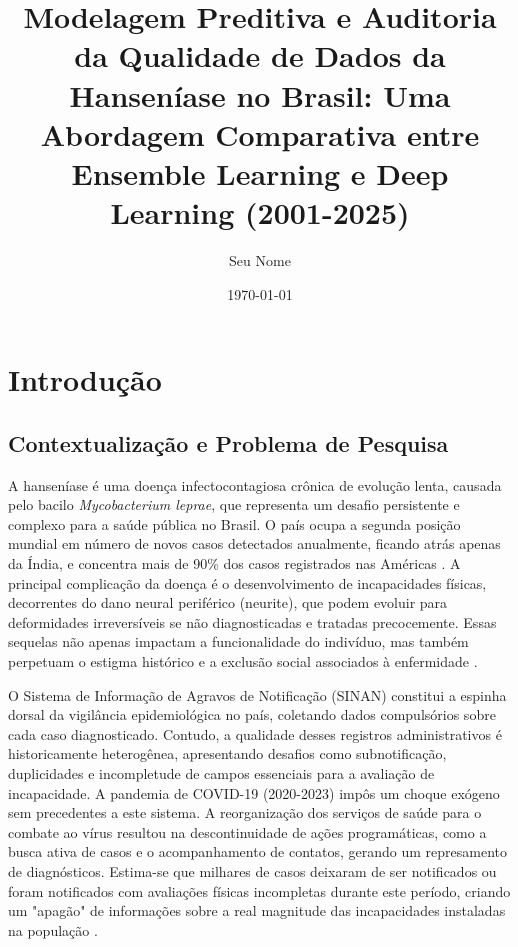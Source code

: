 \documentclass[12pt, a4paper]{report}
\title{\textbf{Modelagem Preditiva e Auditoria da Qualidade de Dados da Hanseníase no Brasil: Uma Abordagem Comparativa entre Ensemble Learning e Deep Learning (2001-2025)}}
\author{Seu Nome}
\date{\today}
\begin{document}
\maketitle
\tableofcontents
\newpage

\chapter{Introdução}

\section{Contextualização e Problema de Pesquisa}
A hanseníase é uma doença infectocontagiosa crônica de evolução lenta, causada pelo bacilo \textit{Mycobacterium leprae}, que representa um desafio persistente e complexo para a saúde pública no Brasil. O país ocupa a segunda posição mundial em número de novos casos detectados anualmente, ficando atrás apenas da Índia, e concentra mais de 90\% dos casos registrados nas Américas \citep{who2021zero}. A principal complicação da doença é o desenvolvimento de incapacidades físicas, decorrentes do dano neural periférico (neurite), que podem evoluir para deformidades irreversíveis se não diagnosticadas e tratadas precocemente. Essas sequelas não apenas impactam a funcionalidade do indivíduo, mas também perpetuam o estigma histórico e a exclusão social associados à enfermidade \citep{brasil2022pcdt}.

O Sistema de Informação de Agravos de Notificação (SINAN) constitui a espinha dorsal da vigilância epidemiológica no país, coletando dados compulsórios sobre cada caso diagnosticado. Contudo, a qualidade desses registros administrativos é historicamente heterogênea, apresentando desafios como subnotificação, duplicidades e incompletude de campos essenciais para a avaliação de incapacidade. A pandemia de COVID-19 (2020-2023) impôs um choque exógeno sem precedentes a este sistema. A reorganização dos serviços de saúde para o combate ao vírus resultou na descontinuidade de ações programáticas, como a busca ativa de casos e o acompanhamento de contatos, gerando um represamento de diagnósticos. Estima-se que milhares de casos deixaram de ser notificados ou foram notificados com avaliações físicas incompletas durante este período, criando um "apagão" de informações sobre a real magnitude das incapacidades instaladas na população \citep{saldanha2021ciencia, tang2021bigdata}.
\end{document}
